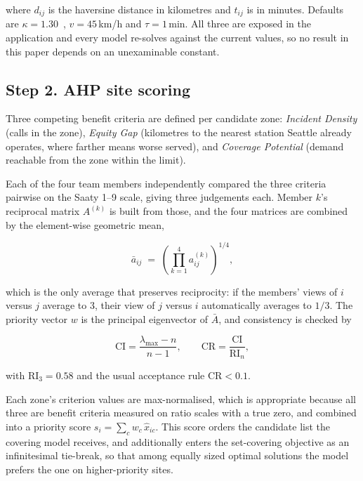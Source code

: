 \documentclass[conference]{IEEEtran}
\begin{document}
where $d_{ij}$ is the haversine distance in kilometres and $t_{ij}$ is in
minutes. Defaults are $\kappa = 1.30$~\cite{boscoe2012}, $v = 45$\,km/h and
$\tau = 1$\,min. All three are exposed in the application and every model
re-solves against the current values, so no result in this paper depends on an
unexaminable constant.

\subsection{Step 2. AHP site scoring}

Three competing benefit criteria are defined per candidate zone: \emph{Incident
Density} (calls in the zone), \emph{Equity Gap} (kilometres to the nearest
station Seattle already operates, where farther means worse served), and
\emph{Coverage Potential} (demand reachable from the zone within the limit).

Each of the four team members independently compared the three criteria
pairwise on the Saaty 1--9 scale, giving three judgements each. Member $k$'s
reciprocal matrix $A^{(k)}$ is built from those, and the four matrices are
combined by the element-wise geometric mean,

\begin{equation}
  \bar{a}_{ij} \;=\; \left( \prod_{k=1}^{4} a^{(k)}_{ij} \right)^{1/4},
  \label{eq:geomean}
\end{equation}

which is the only average that preserves reciprocity: if the members' views of
$i$ versus $j$ average to 3, their view of $j$ versus $i$ automatically averages
to $1/3$. The priority vector $w$ is the principal eigenvector of $\bar{A}$,
and consistency is checked by

\begin{equation}
  \mathrm{CI} = \frac{\lambda_{\max} - n}{n - 1}, \qquad
  \mathrm{CR} = \frac{\mathrm{CI}}{\mathrm{RI}_n},
  \label{eq:cr}
\end{equation}

with $\mathrm{RI}_3 = 0.58$ and the usual acceptance rule $\mathrm{CR} < 0.1$.

Each zone's criterion values are max-normalised, which is appropriate because
all three are benefit criteria measured on ratio scales with a true zero, and
combined into a priority score $s_i = \sum_c w_c \, \hat{x}_{ic}$. This score
orders the candidate list the covering model receives, and additionally enters
the set-covering objective as an infinitesimal tie-break, so that among equally
sized optimal solutions the model prefers the one on higher-priority sites.
\end{document}
